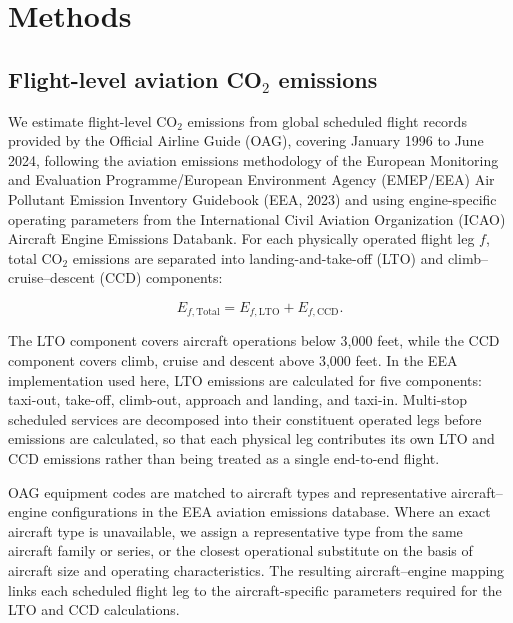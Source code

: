 \documentclass[12pt]{extarticle}
\begin{document}
\section*{Methods}
\subsection*{Flight-level aviation CO$_2$ emissions}

We estimate flight-level CO$_2$ emissions from global scheduled flight records provided by the Official Airline Guide (OAG), covering January 1996 to June 2024, following the aviation emissions methodology of the European Monitoring and Evaluation Programme/European Environment Agency (EMEP/EEA) Air Pollutant Emission Inventory Guidebook (EEA, 2023) and using engine-specific operating parameters from the International Civil Aviation Organization (ICAO) Aircraft Engine Emissions Databank. For each physically operated flight leg $f$, total CO$_2$ emissions are separated into landing-and-take-off (LTO) and climb--cruise--descent (CCD) components:

\begin{equation}
E_{f,\mathrm{Total}}
=
E_{f,\mathrm{LTO}}
+
E_{f,\mathrm{CCD}} .
\label{eq:nature_1}
\end{equation}

The LTO component covers aircraft operations below 3,000 feet, while the CCD component covers climb, cruise and descent above 3,000 feet. In the EEA implementation used here, LTO emissions are calculated for five components: taxi-out, take-off, climb-out, approach and landing, and taxi-in. Multi-stop scheduled services are decomposed into their constituent operated legs before emissions are calculated, so that each physical leg contributes its own LTO and CCD emissions rather than being treated as a single end-to-end flight.

OAG equipment codes are matched to aircraft types and representative aircraft--engine configurations in the EEA aviation emissions database. Where an exact aircraft type is unavailable, we assign a representative type from the same aircraft family or series, or the closest operational substitute on the basis of aircraft size and operating characteristics. The resulting aircraft--engine mapping links each scheduled flight leg to the aircraft-specific parameters required for the LTO and CCD calculations.
\end{document}
